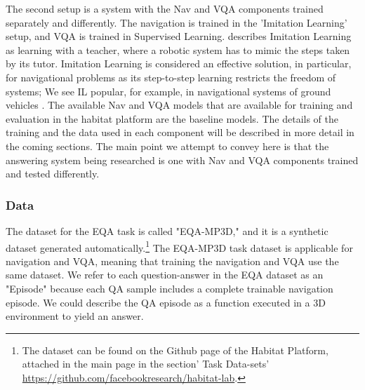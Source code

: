 The second setup is a system with the Nav and VQA components trained separately and differently. The navigation is trained in the 'Imitation Learning' setup, and  VQA is trained in Supervised Learning.\cite{hussein2017imitation} describes Imitation Learning as learning with a teacher, where a robotic system has to mimic the steps taken by its tutor. Imitation Learning is considered an effective solution, in particular, for navigational problems as its step-to-step learning restricts the freedom of systems; We see IL popular, for example, in navigational systems of ground vehicles \cite{silver2008high}. The available Nav and VQA models that are available for training and evaluation in the habitat platform are the baseline models.  The details of the training and the data used in each component will be described in more detail in the coming sections.
The main point we attempt to convey here is that the answering system being researched is one with Nav and VQA components trained and tested differently. %

\subsubsection{Data} 


The dataset for the EQA task is called "EQA-MP3D," and it is a synthetic dataset generated automatically.\footnote{The dataset can be found on the Github page of the Habitat Platform, attached in the main page in the section' Task Data-sets' \url{https://github.com/facebookresearch/habitat-lab}.}  The EQA-MP3D task dataset is applicable for navigation and VQA, meaning that training the navigation and VQA use the same dataset.  We refer to each question-answer in the EQA dataset as an "Episode" because each QA sample includes a complete trainable navigation episode. We could describe the QA episode as a function executed in a 3D environment to yield an answer. 

